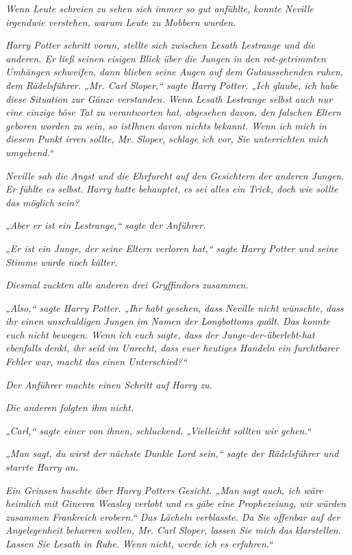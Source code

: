 {\emph{Wenn Leute schreien zu sehen sich immer so gut anfühlte, konnte Neville irgendwie verstehen, warum Leute zu Mobbern wurden.}

\emph{Harry Potter schritt voran, stellte sich zwischen Lesath Lestrange und die anderen. Er ließ seinen eisigen Blick über die Jungen in den rot-getrimmten Umhängen schweifen, dann blieben seine Augen auf dem} \emph{Gutaussehenden ruhen, dem} \emph{Rädelsführer. „Mr. Carl Sloper,“ sagte Harry Potter. „Ich glaube, ich habe diese Situation zur Gänze verstanden. Wenn Lesath Lestrange selbst auch nur eine einzige böse Tat} \emph{zu verantworten hat, abgesehen davon, den falschen Eltern geboren worden zu sein,} \emph{so ist\emph{Ihnen}} \emph{davon nichts bekannt. Wenn ich mich in diesem Punkt irren sollte, Mr. Sloper, schlage ich vor, Sie unterrichten mich umgehend.“}

\emph{Neville sah die Angst und die Ehrfurcht auf den Gesichtern der anderen Jungen. Er fühlte es selbst. Harry hatte} \emph{\emph{behauptet,}} \emph{es sei alles ein Trick, doch wie sollte das möglich sein?}

\emph{„Aber er ist ein} \emph{\emph{Lestrange,}“ sagte der Anführer.}

\emph{„Er ist ein Junge, der} \emph{\emph{seine Eltern verloren hat,}“ sagte Harry Potter und seine} \emph{Stimme wurde noch kälter.}

\emph{Diesmal zuckten alle anderen drei Gryffindors zusammen.}

\emph{„Also,“ sagte Harry Potter. „Ihr habt gesehen, dass Neville nicht wünschte, dass ihr einen unschuldigen Jungen im Namen der Longbottoms quält. Das konnte euch nicht bewegen. Wenn ich euch sagte, dass der Junge-der-überlebt-hat} \emph{\emph{ebenfalls}} \emph{denkt, ihr} \emph{seid} \emph{im Unrecht, dass euer heutiges Handeln ein furchtbarer Fehler war, macht das einen Unterschied?“}

\emph{Der Anführer machte einen Schritt auf Harry zu.}

\emph{Die anderen folgten ihm} \emph{\emph{nicht.}}

\emph{„Carl,“ sagte einer von ihnen, schluckend. „Vielleicht sollten wir gehen.“}

\emph{„Man sagt, du wirst der nächste Dunkle Lord sein,“ sagte der Rädelsführer und starrte Harry an.}

\emph{Ein Grinsen huschte über Harry Potters Gesicht. „Man sagt auch, ich wäre heimlich mit Ginevra Weasley verlobt und es gäbe eine Prophezeiung, wir würden zusammen Frankreich erobern.“ Das Lächeln verblasste. Da Sie offenbar auf der Angelegenheit beharren wollen, Mr. Carl Sloper, lassen Sie mich} \emph{das} \emph{klarstellen.} \emph{\emph{Lassen Sie Lesath in Ruhe.}} \emph{Wenn nicht, werde ich es erfahren.“}

}

